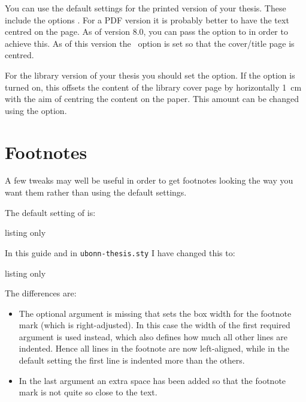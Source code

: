You can use the default settings for the printed version of your thesis.
These include the \KOMAScript options .
For a PDF version it is probably better to have the text centred on the page.
As of version 8.0, you can pass the option  to 
in order to achieve this.
As of this version the \KOMAScript\ option  is set
so that the cover/title page is centred.

For the library version of your thesis you should set the  option.
If the  option is turned on,
this offsets the content of the library cover page by horizontally \SI{1}{\cm}
with the aim of centring the content on the paper.
This amount can be changed using the  option.


\section{Footnotes}%
\label{sec:layout:footnote}

A few tweaks may well be useful in order to get footnotes looking the
way you want them rather than using the default \KOMAScript{}
settings.

The default setting of \KOMAScript{} is:
\begin{tcblisting}{listing only}
\end{tcblisting}
\noindent In this guide and in \texttt{ubonn-thesis.sty} I have changed this to:
\begin{tcblisting}{listing only}
\end{tcblisting}
\noindent The differences are:
\begin{itemize}
\item The optional argument is missing that sets the box width for the
  footnote mark (which is right-adjusted). In this case the width of
  the first required argument is used instead, which also defines how
  much all other lines are indented. Hence all lines in the footnote
  are now left-aligned, while in the default setting the first line is
  indented more than the others.
\item In the last argument an extra space has been added so that the
  footnote mark is not quite so close to the text.
\end{itemize}

